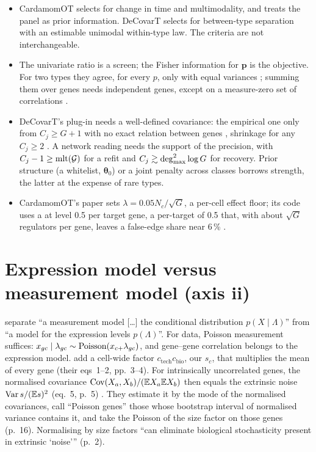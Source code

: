\documentclass[11pt,a4paper]{article}
\begin{document}
\begin{answerbox}[title=In short: gene selection]
\begin{itemize}
  \item CardamomOT selects for change in time and multimodality, and treats the panel as prior
        information. DeCovarT selects for between-type separation with an estimable unimodal within-type
        law. The criteria are not interchangeable.
  \item The univariate  ratio is a screen; the Fisher information for $\bm p$ is the
        objective. For two types they agree, for every $p$, only with equal variances ; summing
        them over genes needs independent genes, except on a measure-zero set of correlations .
  \item DeCovarT's plug-in needs a well-defined covariance: the empirical one only from $C_j\ge G+1$ with
        no exact relation between genes , shrinkage for any $C_j\ge2$ . A network reading
        needs the support of the precision, with $C_j-1\ge\operatorname{mlt}(\mathcal G)$ for a refit and
        $C_j\gtrsim\deg_{\max}^2\log G$ for recovery. Prior structure (a whitelist, $\bm\theta_0$) or a joint
        penalty across classes borrows strength, the latter at the expense of rare types.
  \item CardamomOT's paper sets $\lambda=0.05N_c/\sqrt G$, a per-cell effect floor; its code uses a
         at level 0.5 per target gene, a per-target  of 0.5 that, with
        about $\sqrt G$ regulators per gene, leaves a false-edge share near 6\,\% .
\end{itemize}
\end{answerbox}

\section{Expression model versus measurement model (axis ii)}\label{sec:noise}

\textcite[p.~3]{sarkarSeparatingMeasurementExpression2021} separate \enquote{a measurement model
[\ldots] the conditional distribution $p(X\mid\Lambda)$} from \enquote{a model for the expression levels
$p(\Lambda)$}. For  data, Poisson measurement suffices: $x_{gc}\mid\lambda_{gc}\sim
\operatorname{Poisson}(x_{c+}\lambda_{gc})$, and gene--gene correlation belongs to the expression model.
\textcite{fangExtrinsicBiologicalStochasticity2025} add a cell-wide factor
$c_{\mathrm{tech}}c_{\mathrm{bio}}$, our $s_c$, that multiplies the mean of every gene (their eqs~1--2,
pp.~3--4). For intrinsically uncorrelated genes, the normalised covariance $\operatorname{Cov}(X_a,X_b)/(\mathbb{E} X_a\mathbb{E} X_b)$
then equals the extrinsic noise $\operatorname{Var} s/(\mathbb{E} s)^2$ (eq.~5, p.~5) . They estimate it by the mode of
the normalised covariances, call \enquote{Poisson genes} those whose bootstrap interval of normalised
variance contains it, and take the Poisson  of the size factor on those genes (p.~16).
Normalising by size factors \enquote{can eliminate biological stochasticity present in extrinsic
\enquote{noise}} (p.~2).
\end{document}
